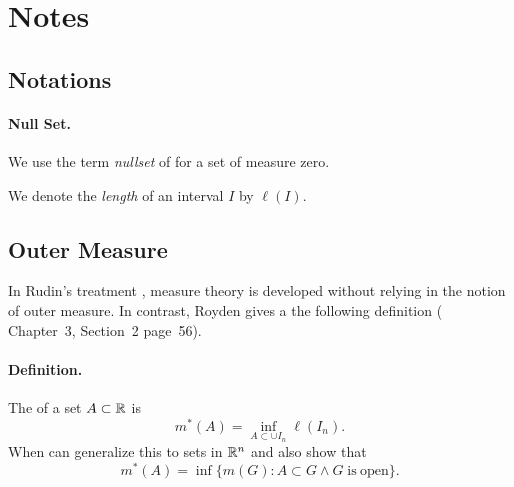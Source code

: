 


\section{Notes}

\subsection{Notations}

\paragraph{Null Set.} We use the term
\emph{nullset}
of \cite{Oxtoby1980}
for a set of measure zero.

We denote the \emph{length} of an interval $I$ by \(\ell(I)\).

\subsection{Outer Measure}

In Rudin's treatment \cite{RudinRCA87}, measure theory is developed
without relying in the notion of outer measure.
In contrast, Royden gives a the following definition
(\cite{Royden} Chapter~3, Section~2 page~56).

\paragraph{Definition.}
The  of a set \(A\subset \mathbb{R}\) is
\begin{equation*}
m^*(A) = \inf_{A\subset \cup I_n} \ell(I_n).
\end{equation*}
When can generalize this to sets in \(\mathbb{R}^n\) and also show that
\begin{equation*}
m^*(A) = \inf \{m(G): A\subset G \wedge G \;\mathrm{is\ open}\}.
\end{equation*}

